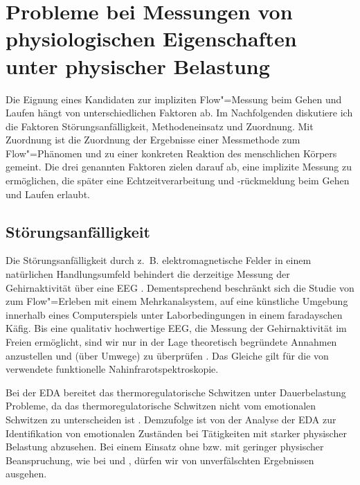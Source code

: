 

\section{Probleme bei Messungen von physiologischen Eigenschaften unter physischer Belastung} 

\label{sec:probleme_bei_messungen}

Die Eignung eines Kandidaten zur impliziten Flow"=Messung beim Gehen und Laufen hängt von unterschiedlichen Faktoren ab. Im Nachfolgenden diskutiere ich die Faktoren Störungsanfälligkeit, Methodeneinsatz und Zuordnung. Mit Zuordnung ist die Zuordnung der Ergebnisse einer Messmethode zum Flow"=Phänomen und zu einer konkreten Reaktion des menschlichen Körpers gemeint. Die drei genannten Faktoren zielen darauf ab, eine implizite Messung zu ermöglichen, die später eine Echtzeitverarbeitung und -rückmeldung beim Gehen und Laufen erlaubt.

\subsection{Störungsanfälligkeit} 

\label{sub:storungsanfalligkeit}

Die Störungsanfälligkeit durch z.~B. elektromagnetische Felder in einem natürlichen Handlungsumfeld behindert die derzeitige Messung der Gehirnaktivität über eine \ac{EEG} \citep[][S.~56]{Henk2014}. Dementsprechend beschränkt sich die Studie von \citet{Hugentobler2011} zum Flow"=Erleben mit einem Mehrkanalsystem, auf eine künstliche Umgebung innerhalb eines Computerspiels unter Laborbedingungen in einem faradayschen Käfig. Bis eine qualitativ hochwertige \ac{EEG}, die Messung der Gehirnaktivität im Freien ermöglicht, sind wir nur in der Lage theoretisch begründete Annahmen anzustellen und (über Umwege) zu überprüfen \citep[][S.~56]{Henk2014}. Das Gleiche gilt für die von \citet{Harmat2015} verwendete funktionelle Nahinfrarotspektroskopie.

Bei der \ac{EDA} bereitet das thermoregulatorische Schwitzen unter Dauerbelastung Probleme, da das thermoregulatorische Schwitzen nicht vom emotionalen Schwitzen zu unterscheiden ist \citep{Baumeister2009}. Demzufolge ist von der Analyse der \ac{EDA} zur Identifikation von emotionalen Zuständen bei Tätigkeiten mit starker physischer Belastung abzusehen. Bei einem Einsatz ohne bzw. mit geringer physischer Beanspruchung, wie bei \citet{Kivikangas2006} und \citet{Nacke2008}, dürfen wir von unverfälschten Ergebnissen ausgehen.

